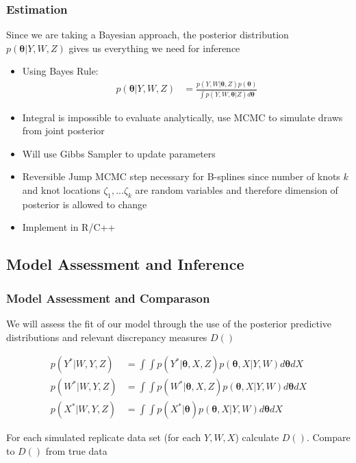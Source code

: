 \documentclass[handout]{beamer}\usepackage[]{graphicx}\usepackage[]{color}
\begin{document}
\begin{frame}
\frametitle{Estimation}
Since we are taking a Bayesian approach, the posterior distribution $p(\boldsymbol{\theta}|Y,W,Z)$ gives us everything we need for inference

\begin{itemize}
\item
Using Bayes Rule: 
\begin{align}
p(\boldsymbol{\theta}|Y,W,Z) &= \frac{p(Y,W|\boldsymbol{\theta},Z) p(\boldsymbol{\theta})}{\int p(Y,W,\boldsymbol{\theta}|Z) d\boldsymbol{\theta}}
\end{align}
\item 
Integral is impossible to evaluate analytically, use MCMC to simulate draws from joint posterior
\item
Will use Gibbs Sampler to update parameters 
\item
Reversible Jump MCMC step necessary for B-splines since number of knots $k$ and knot locations $\zeta_1,...\zeta_k$ are random variables and therefore dimension of posterior is allowed to change
\item
Implement in R/C++
\end{itemize}

\end{frame}

\subsection{Model Assessment and Inference}

\begin{frame}
\frametitle{Model Assessment and Comparason}
We will assess the fit of our model through the use of the posterior predictive distributions and relevant discrepancy measures $D()$

\begin{align}
  p(Y^*|W,Y,Z) &= \int \int p(Y^*|\boldsymbol{\theta},X,Z) p(\boldsymbol{\theta}, X|Y,W) d\boldsymbol{\theta} dX \\
  p(W^*|W,Y,Z) &= \int \int p(W^*|\boldsymbol{\theta},X,Z) p(\boldsymbol{\theta}, X|Y,W) d\boldsymbol{\theta} dX \\
  p(X^*|W,Y,Z) &= \int \int p(X^*|\boldsymbol{\theta}) p(\boldsymbol{\theta}, X|Y,W) d\boldsymbol{\theta} dX
\end{align}

For each simulated replicate data set (for each $Y,W,X$) calculate $D()$. Compare to $D()$ from true data

\end{frame}
\end{document}
